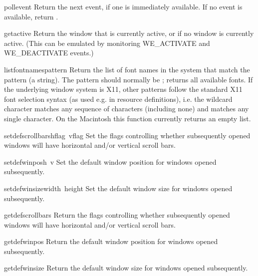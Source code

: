 \begin{funcdesc}{pollevent}{}
Return the next event, if one is immediately available.
If no event is available, return \code{()}.
\end{funcdesc}

\begin{funcdesc}{getactive}{}
Return the window that is currently active, or  if no
window is currently active.  (This can be emulated by monitoring
WE_ACTIVATE and WE_DEACTIVATE events.)
\end{funcdesc}

\begin{funcdesc}{listfontnames}{pattern}
Return the list of font names in the system that match the pattern (a
string).  The pattern should normally be ; returns all
available fonts.  If the underlying window system is X11, other
patterns follow the standard X11 font selection syntax (as used e.g.
in resource definitions), i.e. the wildcard character 
matches any sequence of characters (including none) and 
matches any single character.
On the Macintosh this function currently returns an empty list.
\end{funcdesc}

\begin{funcdesc}{setdefscrollbars}{hflag\, vflag}
Set the flags controlling whether subsequently opened windows will
have horizontal and/or vertical scroll bars.
\end{funcdesc}

\begin{funcdesc}{setdefwinpos}{h\, v}
Set the default window position for windows opened subsequently.
\end{funcdesc}

\begin{funcdesc}{setdefwinsize}{width\, height}
Set the default window size for windows opened subsequently.
\end{funcdesc}

\begin{funcdesc}{getdefscrollbars}{}
Return the flags controlling whether subsequently opened windows will
have horizontal and/or vertical scroll bars.
\end{funcdesc}

\begin{funcdesc}{getdefwinpos}{}
Return the default window position for windows opened subsequently.
\end{funcdesc}

\begin{funcdesc}{getdefwinsize}{}
Return the default window size for windows opened subsequently.
\end{funcdesc}

